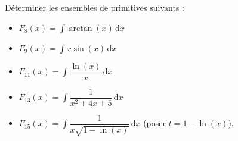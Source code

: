 
\begin{exercice}\label{exostarterST-0018devoir}

Déterminer les ensembles de  primitives suivants :
  \begin{itemize}
  
  \item $F_{8}(x)=\displaystyle\int\arctan (x) \,\mathrm dx$ 
  \item $F_{9}(x)=\displaystyle\int x\sin (x) \,\mathrm dx$  
  \item $F_{11}(x)=\displaystyle\int\dfrac{\ln(x)}{x}\,\mathrm dx$
  \item $F_{13}(x)=\displaystyle\int\dfrac{1}{x^2+4x+5}\,\mathrm dx$
  \item $F_{15}(x)=\displaystyle\int \dfrac{1}{x\sqrt{1-\ln (x)}}\,\mathrm dx$  (poser $t=1-\ln(x)$).



  \end{itemize}


\end{exercice}
